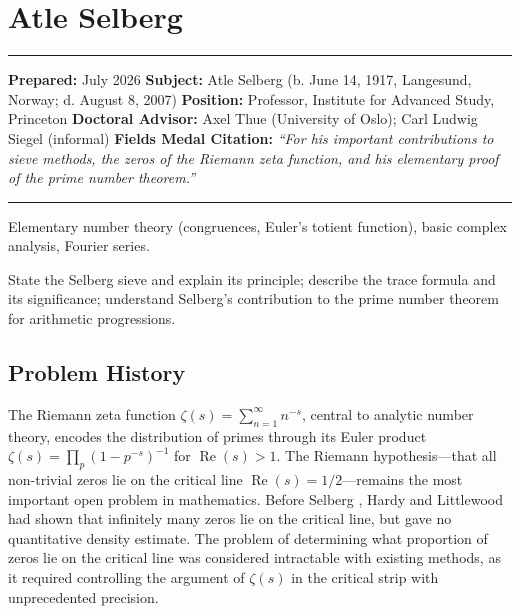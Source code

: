 \chapter{Atle Selberg}\label{ch1950atleselberg:atle-selberg-fields-medal-1950-a-comprehensive-report}

\begin{center}\rule{0.5\linewidth}{0.5pt}\end{center}

\textbf{Prepared:} July 2026 \textbf{Subject:} Atle Selberg (b. June 14,
1917, Langesund, Norway; d. August 8, 2007) \textbf{Position:} Professor, Institute for
Advanced Study, Princeton \textbf{Doctoral Advisor:} Axel Thue (University of Oslo); Carl Ludwig Siegel (informal) \textbf{Fields Medal Citation:} \emph{``For his important contributions to sieve methods, the zeros of the Riemann zeta function, and his elementary proof of the prime number theorem.''}

\begin{center}\rule{0.5\linewidth}{0.5pt}\end{center}

\begin{prereqs} Elementary number theory (congruences, Euler's totient function), basic complex analysis, Fourier series. \end{prereqs}

\begin{objectives} State the Selberg sieve and explain its principle; describe the trace formula and its significance; understand Selberg's contribution to the prime number theorem for arithmetic progressions. \end{objectives}

\section{Problem History}

The Riemann zeta function $\zeta(s) = \sum_{n=1}^\infty n^{-s}$, central to analytic number theory, encodes the distribution of primes through its Euler product $\zeta(s) = \prod_p (1-p^{-s})^{-1}$ for $\operatorname{Re}(s) > 1$. The Riemann hypothesis---that all non-trivial zeros lie on the critical line $\operatorname{Re}(s) = 1/2$---remains the most important open problem in mathematics. Before Selberg \cite{selberg1947}, Hardy and Littlewood had shown that infinitely many zeros lie on the critical line, but gave no quantitative density estimate. The problem of determining what proportion of zeros lie on the critical line was considered intractable with existing methods, as it required controlling the argument of $\zeta(s)$ in the critical strip with unprecedented precision.

